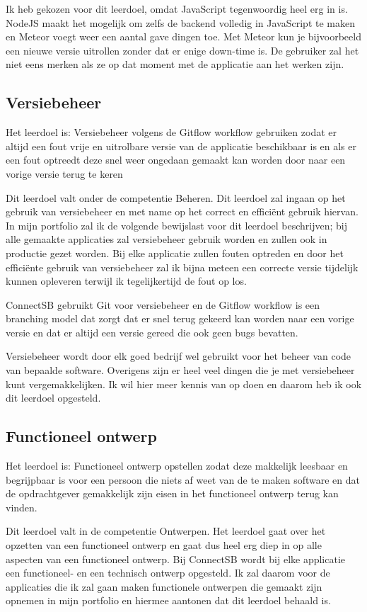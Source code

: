 Ik heb gekozen voor dit leerdoel, omdat JavaScript tegenwoordig heel erg in is. NodeJS maakt het mogelijk om zelfs de backend volledig in JavaScript te maken en Meteor voegt weer een aantal gave dingen toe. Met Meteor kun je bijvoorbeeld een nieuwe versie uitrollen zonder dat er enige down-time is. De gebruiker zal het niet eens merken als ze op dat moment met de applicatie aan het werken zijn. 

\subsection{Versiebeheer}
Het leerdoel is: Versiebeheer volgens de Gitflow workflow gebruiken zodat er altijd een fout vrije en uitrolbare versie van de applicatie beschikbaar is en als er een fout optreedt deze snel weer ongedaan gemaakt kan worden door naar een vorige versie terug te keren

Dit leerdoel valt onder de competentie Beheren. Dit leerdoel zal ingaan op het gebruik van versiebeheer en met name op het correct en efficiënt gebruik hiervan. In mijn portfolio zal ik de volgende bewijslast voor dit leerdoel beschrijven; bij alle gemaakte applicaties zal versiebeheer gebruik worden en zullen ook in productie gezet worden. Bij elke applicatie zullen fouten optreden en door het efficiënte gebruik van versiebeheer zal ik bijna meteen een correcte versie tijdelijk kunnen opleveren terwijl ik tegelijkertijd de fout op los.

ConnectSB gebruikt Git voor versiebeheer en de Gitflow workflow is een branching model dat zorgt dat er snel terug gekeerd kan worden naar een vorige versie en dat er altijd een versie gereed die ook geen bugs bevatten.

Versiebeheer wordt door elk goed bedrijf wel gebruikt voor het beheer van code van bepaalde software. Overigens zijn er heel veel dingen die je met versiebeheer kunt vergemakkelijken. Ik wil hier meer kennis van op doen en daarom heb ik ook dit leerdoel opgesteld.

\subsection{Functioneel ontwerp}
Het leerdoel is: Functioneel ontwerp opstellen zodat deze makkelijk leesbaar en begrijpbaar is voor een persoon die niets af weet van de te maken software en dat de opdrachtgever gemakkelijk zijn eisen in het functioneel ontwerp terug kan vinden.

Dit leerdoel valt in de competentie Ontwerpen. Het leerdoel gaat over het opzetten van een functioneel ontwerp en gaat dus heel erg diep in op alle aspecten van een functioneel ontwerp. Bij ConnectSB wordt bij elke applicatie een functioneel- en een technisch ontwerp opgesteld. Ik zal daarom voor de applicaties die ik zal gaan maken functionele ontwerpen die gemaakt zijn opnemen in mijn portfolio en hiermee aantonen dat dit leerdoel behaald is.

